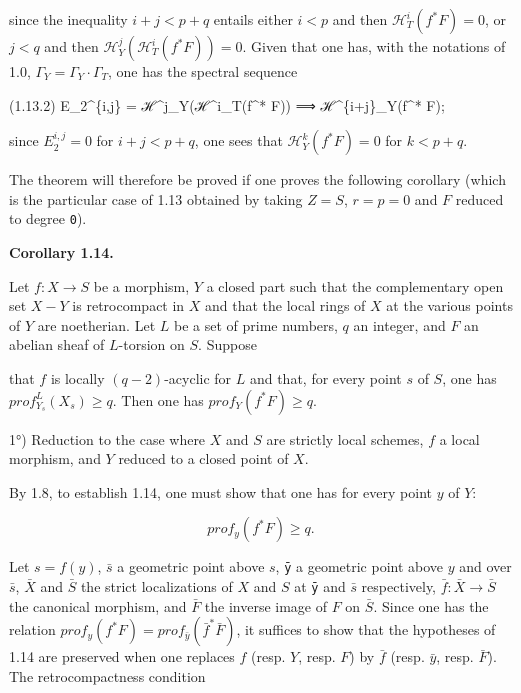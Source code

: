 \documentclass[
  11pt,
  a4paper,
]{book}
\newenvironment{Shaded}{}{}
\newcommand{\NormalTok}[1]{#1}
\begin{document}
since the inequality \(i + j < p + q\) entails either \(i < p\) and then
\(\mathcal{H}^{i}_{T}(f^{*} F) = 0\), or \(j < q\) and then
\(\mathcal{H}^{j}_{Y}(\mathcal{H}^{i}_{T}(f^{*} F)) = 0\). Given that
one has, with the notations of 1.0, \(\Gamma_{Y}
= \Gamma_{Y} \cdot \Gamma_{T}\), one has the spectral sequence

\begin{Shaded}
\begin{Highlighting}[]
\NormalTok{(1.13.2)    E\_2\^{}\{i,j\} = ℋ\^{}j\_Y(ℋ\^{}i\_T(f\^{}* F)) ⟹ ℋ\^{}\{i+j\}\_Y(f\^{}* F);}
\end{Highlighting}
\end{Shaded}

since \(E^{i,j}_{2} = 0\) for \(i + j < p + q\), one sees that
\(\mathcal{H}^{k}_{Y}(f^{*} F) = 0\) for \(k < p + q\).

The theorem will therefore be proved if one proves the following
corollary (which is the particular case of 1.13 obtained by taking
\(Z = S\), \(r = p = 0\) and \(F\) reduced to degree \texttt{0}).

\textbf{Corollary 1.14.}

Let \(f : X \to S\) be a morphism, \(Y\) a closed part such that the
complementary open set \(X - Y\) is retrocompact in \(X\) and that the
local rings of \(X\) at the various points of \(Y\) are noetherian. Let
\(L\) be a set of prime numbers, \(q\) an integer, and \(F\) an abelian
sheaf of \(L\)-torsion on \(S\). Suppose

that \(f\) is locally \((q - 2)\)-acyclic for \(L\) and that, for every
point \(s\) of \(S\), one has \(prof^{L}_{Y_{s}}(X_{s})
\geqslant q\). Then one has \(prof_{Y}(f^{*} F) \geqslant q\).

1°) Reduction to the case where \(X\) and \(S\) are strictly local
schemes, \(f\) a local morphism, and \(Y\) reduced to a closed point of
\(X\).

By 1.8, to establish 1.14, one must show that one has for every point
\(y\) of \(Y\):

\[ prof_{y}(f^{*} F) \geqslant q. \]

Let \(s = f(y)\), \(\bar{s}\) a geometric point above \(s\), \texttt{ȳ}
a geometric point above \(y\) and over \(\bar{s}\), \(\bar{X}\) and
\(\bar{S}\) the strict localizations of \(X\) and \(S\) at \texttt{ȳ}
and \(\bar{s}\) respectively, \(\bar{f} : \bar{X} \to \bar{S}\) the
canonical morphism, and \(\bar{F}\) the inverse image of \(F\) on
\(\bar{S}\). Since one has the relation \(prof_{y}(f^{*} F) =
prof_{\bar{y}}(\bar{f}^{*} \bar{F})\), it suffices to show that the
hypotheses of 1.14 are preserved when one replaces \(f\) (resp. \(Y\),
resp. \(F\)) by \(\bar{f}\) (resp. \({\bar{y}}\), resp. \(\bar{F}\)).
The retrocompactness condition
\end{document}
